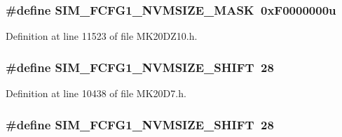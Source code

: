 \subsubsection[{\texorpdfstring{S\+I\+M\+\_\+\+F\+C\+F\+G1\+\_\+\+N\+V\+M\+S\+I\+Z\+E\+\_\+\+M\+A\+SK}{SIM_FCFG1_NVMSIZE_MASK}}]{\setlength{\rightskip}{0pt plus 5cm}\#define S\+I\+M\+\_\+\+F\+C\+F\+G1\+\_\+\+N\+V\+M\+S\+I\+Z\+E\+\_\+\+M\+A\+SK~0x\+F0000000u}\hypertarget{group___s_i_m___register___masks_ga048c88e59900fb06533d5cb2003414b7}{}\label{group___s_i_m___register___masks_ga048c88e59900fb06533d5cb2003414b7}


Definition at line 11523 of file M\+K20\+D\+Z10.\+h.

\subsubsection[{\texorpdfstring{S\+I\+M\+\_\+\+F\+C\+F\+G1\+\_\+\+N\+V\+M\+S\+I\+Z\+E\+\_\+\+S\+H\+I\+FT}{SIM_FCFG1_NVMSIZE_SHIFT}}]{\setlength{\rightskip}{0pt plus 5cm}\#define S\+I\+M\+\_\+\+F\+C\+F\+G1\+\_\+\+N\+V\+M\+S\+I\+Z\+E\+\_\+\+S\+H\+I\+FT~28}\hypertarget{group___s_i_m___register___masks_ga8ec773a4e814bc88e7ab72da4e32316b}{}\label{group___s_i_m___register___masks_ga8ec773a4e814bc88e7ab72da4e32316b}


Definition at line 10438 of file M\+K20\+D7.\+h.

\subsubsection[{\texorpdfstring{S\+I\+M\+\_\+\+F\+C\+F\+G1\+\_\+\+N\+V\+M\+S\+I\+Z\+E\+\_\+\+S\+H\+I\+FT}{SIM_FCFG1_NVMSIZE_SHIFT}}]{\setlength{\rightskip}{0pt plus 5cm}\#define S\+I\+M\+\_\+\+F\+C\+F\+G1\+\_\+\+N\+V\+M\+S\+I\+Z\+E\+\_\+\+S\+H\+I\+FT~28}\hypertarget{group___s_i_m___register___masks_ga8ec773a4e814bc88e7ab72da4e32316b}{}\label{group___s_i_m___register___masks_ga8ec773a4e814bc88e7ab72da4e32316b}


